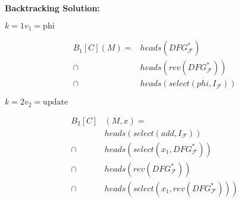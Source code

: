 \vspace{1cm}
\begin{minipage}[t]{6cm}
    \centering
    {\Large\bf Backtracking Solution:}

    $k=1$\quad$v_1=\text{phi}$
    \begin{graybox}
        \setlength{\abovedisplayskip}{0pt}
        \setlength{\belowdisplayskip}{0pt}
        \vspace{-0.5em}
        \begin{align*}
            B_1[C](M)={}&heads(DFG_\mathcal{F}^*)\\
                \mathrel\cap{}&heads(rev(DFG_\mathcal{F}^*))\\
                \mathrel\cap{}&heads(select(phi,I_\mathcal{F}))
        \end{align*}
    \end{graybox}
    \vspace{-0.75em}
    \hspace{0.3cm}
    \hspace{0.3cm}

    $k=2$\quad$v_2=\text{update}$
    \begin{graybox}
        \setlength{\abovedisplayskip}{0pt}
        \setlength{\belowdisplayskip}{0pt}
        \vspace{-0.5em}
        \begin{align*}
            B_2[C]&(M,x)=\\
                            {}&heads(select(add,I_\mathcal{F}))\\
                \mathrel\cap{}&heads(select(x_1,DFG_\mathcal{F}^*))\\
                \mathrel\cap{}&heads(rev(DFG_\mathcal{F}^*))\\
                \mathrel\cap{}&heads(select(x_1,rev(DFG_\mathcal{F}^*)))
        \end{align*}
    \end{graybox}
    \vspace{-0.75em}
    \hspace{0.3cm}
    \hspace{0.3cm}


\end{minipage}
